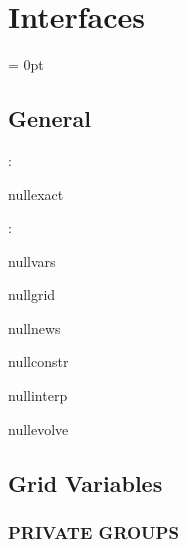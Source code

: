 
\section{Interfaces} 


\parskip = 0pt

\vspace{3mm} \subsection*{General}

: 

nullexact
\vspace{2mm}

: 

nullvars

nullgrid

nullnews

nullconstr

nullinterp

nullevolve
\vspace{2mm}
\subsection*{Grid Variables}
\vspace{5mm}\subsubsection{PRIVATE GROUPS}

\vspace{5mm}

